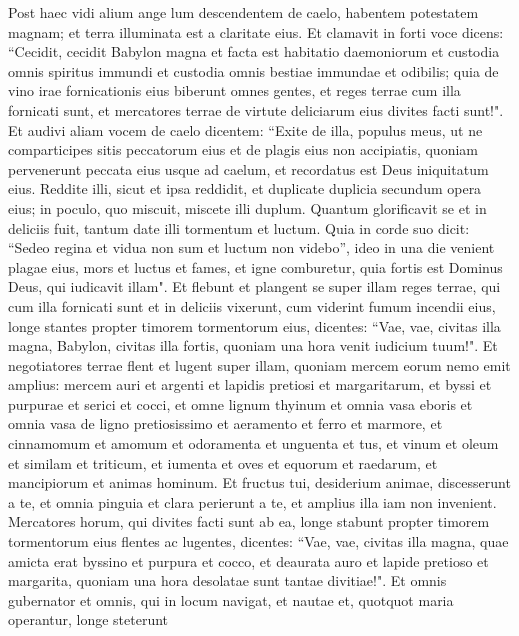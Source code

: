 \begin{biblechapter}  
\verse Post haec vidi alium ange lum descendentem de caelo, habentem potestatem magnam; et terra illuminata est a claritate eius. 
\verse Et clamavit in forti voce dicens: “Cecidit, cecidit Babylon magna et facta est habitatio daemoniorum et custodia omnis spiritus immundi et custodia omnis bestiae immundae et odibilis; 
\verse quia de vino irae fornicationis eius biberunt omnes gentes, et reges terrae cum illa fornicati sunt, et mercatores terrae de virtute deliciarum eius divites facti sunt!". 
\verse Et audivi aliam vocem de caelo dicentem: “Exite de illa, populus meus, ut ne comparticipes sitis peccatorum eius et de plagis eius non accipiatis, 
\verse quoniam pervenerunt peccata eius usque ad caelum, et recordatus est Deus iniquitatum eius. 
\verse Reddite illi, sicut et ipsa reddidit, et duplicate duplicia secundum opera eius; in poculo, quo miscuit, miscete illi duplum. 
\verse Quantum glorificavit se et in deliciis fuit, tantum date illi tormentum et luctum. Quia in corde suo dicit: “Sedeo regina et vidua non sum et luctum non videbo”, 
\verse ideo in una die venient plagae eius, mors et luctus et fames, et igne comburetur, quia fortis est Dominus Deus, qui iudicavit illam". 
\verse Et flebunt et plangent se super illam reges terrae, qui cum illa fornicati sunt et in deliciis vixerunt, cum viderint fumum incendii eius, 
\verse longe stantes propter timorem tormentorum eius, dicentes: “Vae, vae, civitas illa magna, Babylon, civitas illa fortis, quoniam una hora venit iudicium tuum!". 
\verse Et negotiatores terrae flent et lugent super illam, quoniam mercem eorum nemo emit amplius: 
\verse mercem auri et argenti et lapidis pretiosi et margaritarum, et byssi et purpurae et serici et cocci, et omne lignum thyinum et omnia vasa eboris et omnia vasa de ligno pretiosissimo et aeramento et ferro et marmore,  
\verse et cinnamomum et amomum et odoramenta et unguenta et tus, et vinum et oleum et similam et triticum, et iumenta et oves et equorum et raedarum, et mancipiorum et animas hominum. 
\verse Et fructus tui, desiderium animae, discesserunt a te, et omnia pinguia et clara perierunt a te, et amplius illa iam non invenient. 
\verse Mercatores horum, qui divites facti sunt ab ea, longe stabunt propter timorem tormentorum eius flentes ac lugentes, 
\verse dicentes: “Vae, vae, civitas illa magna, quae amicta erat byssino et purpura et cocco, et deaurata auro et lapide pretioso et margarita, 
\verse quoniam una hora desolatae sunt tantae divitiae!". Et omnis gubernator et omnis, qui in locum navigat, et nautae et, quotquot maria operantur, longe steterunt 

\end{biblechapter}
